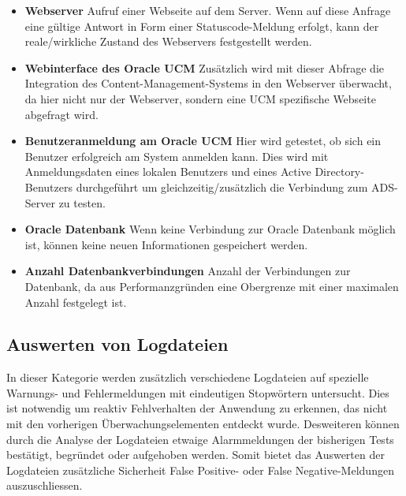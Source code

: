 \begin{itemize}
\item \textbf{Webserver} Aufruf einer Webseite auf dem Server. Wenn auf diese Anfrage eine gültige Antwort in Form einer Statuscode-Meldung erfolgt, kann der reale/wirkliche Zustand des Webservers festgestellt werden.

\item \textbf{Webinterface des Oracle UCM} Zusätzlich wird mit dieser Abfrage die Integration des Content-Management-Systems in den Webserver überwacht, da hier nicht nur der Webserver, sondern eine UCM spezifische Webseite abgefragt wird.

\item \textbf{Benutzeranmeldung am Oracle UCM} Hier wird getestet, ob sich ein Benutzer erfolgreich am System anmelden kann.
Dies wird mit Anmeldungsdaten eines lokalen Benutzers und eines Active Directory-Benutzers durchgeführt um gleichzeitig/zusätzlich die Verbindung zum ADS-Server zu testen.

\item \textbf{Oracle Datenbank} Wenn keine Verbindung zur Oracle Datenbank möglich ist, können keine neuen Informationen gespeichert werden. 


\item \textbf{Anzahl Datenbankverbindungen} Anzahl der Verbindungen zur Datenbank, da aus Performanzgründen eine Obergrenze mit einer maximalen Anzahl festgelegt ist.
\end{itemize}

\subsection{Auswerten von Logdateien}
\label{checklog}
In dieser Kategorie werden zusätzlich verschiedene Logdateien auf spezielle Warnungs- und Fehlermeldungen mit eindeutigen Stopwörtern untersucht.
Dies ist notwendig um reaktiv Fehlverhalten der Anwendung zu erkennen, das nicht mit den vorherigen Überwachungselementen entdeckt wurde.
Desweiteren können durch die Analyse der Logdateien etwaige Alarmmeldungen der bisherigen Tests bestätigt, begründet oder aufgehoben werden.
Somit bietet das Auswerten der Logdateien zusätzliche Sicherheit False Positive- oder False Negative-Meldungen auszuschliessen.

